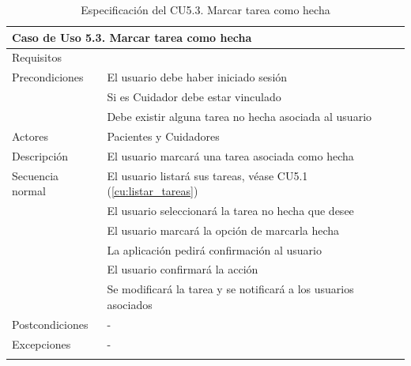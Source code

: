 \begin{longtable}{|p{} p{}|}
    \hline
    \multicolumn{2}{|l|}{\textbf{Caso de Uso 5.3. Marcar tarea como hecha}} \\ \hline \hline
    Requisitos          & {req:marcar_tarea_hecha} \\ \hline
    Precondiciones      & El usuario debe haber iniciado sesión \\
                        & Si es Cuidador debe estar vinculado \\ 
                        & Debe existir alguna tarea no hecha asociada al usuario \\ \hline
    Actores             & Pacientes y Cuidadores \\ \hline
    Descripción         & El usuario marcará una tarea asociada como hecha \\ \hline
    Secuencia normal    & El usuario listará sus tareas, véase CU5.1 (\ref{cu:listar_tareas}) \\
                        & El usuario seleccionará la tarea no hecha que desee \\
                        & El usuario marcará la opción de marcarla hecha \\
                        & La aplicación pedirá confirmación al usuario \\
                        & El usuario confirmará la acción \\
                        & Se modificará la tarea y se notificará a los usuarios asociados \\ \hline
    Postcondiciones     & - \\ \hline
    Excepciones         & - \\ \hline
    \caption{Especificación del CU5.3. Marcar tarea como hecha}
    \label{cu:marcar_tarea}
\end{longtable}

